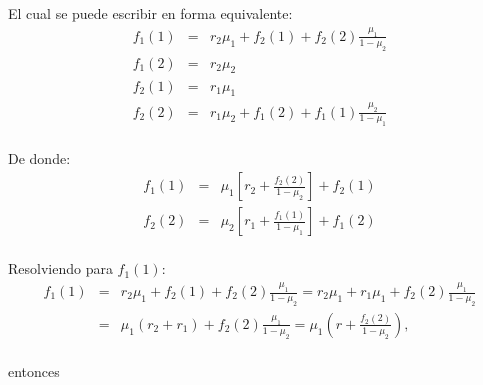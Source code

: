 El cual se puede escribir en forma equivalente:
\begin{eqnarray*}
f_{1}\left(1\right)&=&r_{2}\mu_{1}+f_{2}\left(1\right)+f_{2}\left(2\right)\frac{\mu_{1}}{1-\mu_{2}}\\
f_{1}\left(2\right)&=&r_{2}\mu_{2}\\
f_{2}\left(1\right)&=&r_{1}\mu_{1}\\
f_{2}\left(2\right)&=&r_{1}\mu_{2}+f_{1}\left(2\right)+f_{1}\left(1\right)\frac{\mu_{2}}{1-\mu_{1}}\\
\end{eqnarray*}

De donde:
\begin{eqnarray*}
f_{1}\left(1\right)&=&\mu_{1}\left[r_{2}+\frac{f_{2}\left(2\right)}{1-\mu_{2}}\right]+f_{2}\left(1\right)\\
f_{2}\left(2\right)&=&\mu_{2}\left[r_{1}+\frac{f_{1}\left(1\right)}{1-\mu_{1}}\right]+f_{1}\left(2\right)\\
\end{eqnarray*}

Resolviendo para $f_{1}\left(1\right)$:
\begin{eqnarray*}
f_{1}\left(1\right)&=&r_{2}\mu_{1}+f_{2}\left(1\right)+f_{2}\left(2\right)\frac{\mu_{1}}{1-\mu_{2}}=r_{2}\mu_{1}+r_{1}\mu_{1}+f_{2}\left(2\right)\frac{\mu_{1}}{1-\mu_{2}}\\
&=&\mu_{1}\left(r_{2}+r_{1}\right)+f_{2}\left(2\right)\frac{\mu_{1}}{1-\mu_{2}}=\mu_{1}\left(r+\frac{f_{2}\left(2\right)}{1-\mu_{2}}\right),\\
\end{eqnarray*}

entonces

